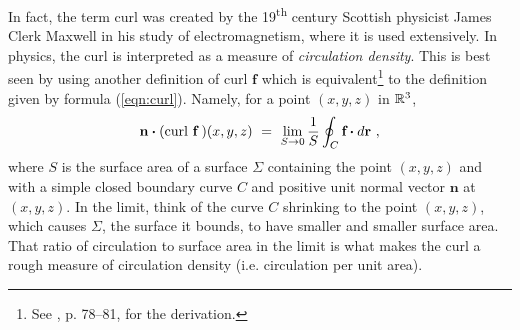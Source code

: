 In fact, the term curl was created by the 19\textsuperscript{th} century Scottish physicist James Clerk Maxwell in his
study of electromagnetism, where it is used extensively. In physics, the curl is interpreted as a measure of
\emph{circulation density}. This is best seen by using another definition of curl $\mathbf{f}$ which is
equivalent\footnote{See \cite{sch}, p. 78--81, for the derivation.} to the definition given by
formula (\ref{eqn:curl}). Namely, for a point $(x,y,z)$ in $\mathbb{R}^{3}$,
\begin{equation}\label{eqn:curlalt}
 \mathbf{n} \bm{\cdot} (\text{curl}~\mathbf{f}\,)(x,y,z) ~=~ \lim_{S \to 0} \frac{1}{S} \oint_{C} \textbf{f} \bm{\cdot} d\textbf{r} ~,
\end{equation}
where $S$ is the surface area of a surface $\Sigma$ containing the point $(x,y,z)$ and with a simple closed boundary
curve $C$ and positive unit normal vector $\mathbf{n}$ at $(x,y,z)$. In the limit, think of the curve $C$ shrinking to
the point $(x,y,z)$, which causes $\Sigma$, the surface it bounds, to have smaller and smaller surface area. That ratio
of circulation to surface area in the limit is what makes the curl a rough measure of circulation density (i.e.
circulation per unit area).

